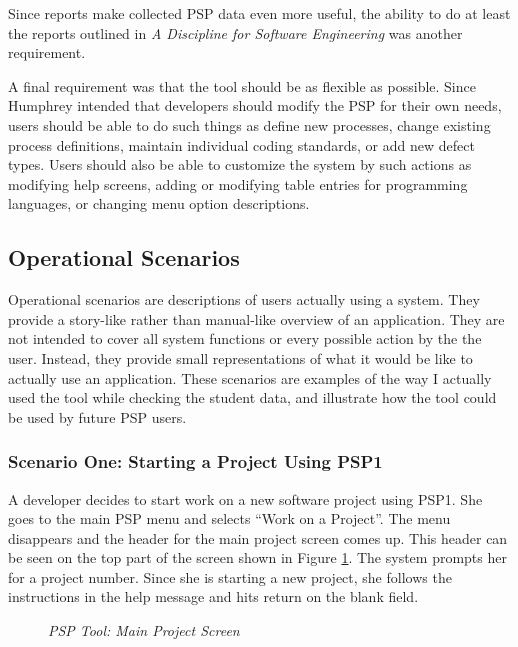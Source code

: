 Since reports make collected PSP data even more useful, the ability to do
at least the reports outlined in {\it A Discipline for Software Engineering}
was another requirement.

A final requirement was that the tool should be as flexible as possible.
Since Humphrey intended that developers should modify the PSP for their own
needs, users should be able to do such things as define new processes,
change existing process definitions, maintain individual coding standards,
or add new defect types.  Users should also be able to customize the system
by such actions as modifying help screens, adding or modifying table
entries for programming languages, or changing menu option descriptions.

\subsection{Operational Scenarios}

Operational scenarios are descriptions of users actually using a system.
They provide a story-like rather than manual-like overview of an
application.  They are not intended to cover all system functions or every
possible action by the the user.  Instead, they provide small
representations of what it would be like to actually use an application.
These scenarios are examples of the way I actually used the tool while
checking the student data, and illustrate how the tool could be used by
future PSP users.

\subsubsection{Scenario One: Starting a Project Using PSP1}

A developer decides to start work on a new software project using PSP1.
She goes to the main PSP menu and selects ``Work on a Project''.  The menu
disappears and the header for the main project screen comes up. This header
can be seen on the top part of the screen shown in Figure
\ref{fig:toolSample1}. The system prompts her for a project number.  Since
she is starting a new project, she follows the instructions in the help
message and hits return on the blank field.  

\begin{figure} [htp]
    {\centerline{}}
    \caption[PSP Tool: Main Project Screen]{\label{fig:toolSample1}
    {\em PSP Tool: Main Project Screen}}
\end{figure}

